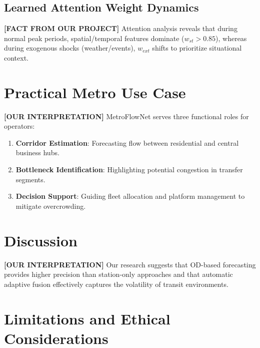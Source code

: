 \documentclass[conference]{IEEEtran}
\begin{document}
\subsection{Learned Attention Weight Dynamics}
\noindent \textbf{[FACT FROM OUR PROJECT]} Attention analysis reveals that during normal peak periods, spatial/temporal features dominate ($w_{st} > 0.85$), whereas during exogenous shocks (weather/events), $w_{ext}$ shifts to prioritize situational context.

\section{Practical Metro Use Case}
\label{sec:case_study}

\noindent \textbf{[OUR INTERPRETATION]} MetroFlowNet serves three functional roles for operators:
\begin{enumerate}
    \item \textbf{Corridor Estimation}: Forecasting flow between residential and central business hubs.
    \item \textbf{Bottleneck Identification}: Highlighting potential congestion in transfer segments.
    \item \textbf{Decision Support}: Guiding fleet allocation and platform management to mitigate overcrowding.
\end{enumerate}

\section{Discussion}
\label{sec:discussion}

\noindent \textbf{[OUR INTERPRETATION]} Our research suggests that OD-based forecasting provides higher precision than station-only approaches and that automatic adaptive fusion effectively captures the volatility of transit environments.

\section{Limitations and Ethical Considerations}
\label{sec:limitations}
\end{document}
